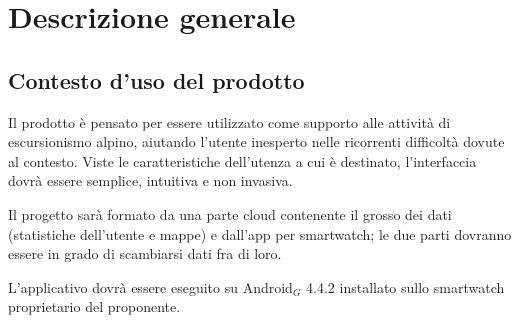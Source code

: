 \clearpage
\section{Descrizione generale}
\subsection{Contesto d'uso del prodotto}
Il prodotto è pensato per essere utilizzato come supporto alle attività di escursionismo alpino, aiutando l'utente inesperto nelle ricorrenti difficoltà dovute al contesto. Viste le caratteristiche dell'utenza a cui è destinato, l'interfaccia dovrà essere semplice, intuitiva e non invasiva.

Il progetto sarà formato da una parte cloud contenente il grosso dei dati (statistiche dell'utente e mappe) e dall'app per smartwatch; le due parti dovranno essere in grado di scambiarsi dati fra di loro. 

L'applicativo dovrà essere eseguito su Android$_{G}$ 4.4.2 installato sullo smartwatch proprietario del proponente. 

